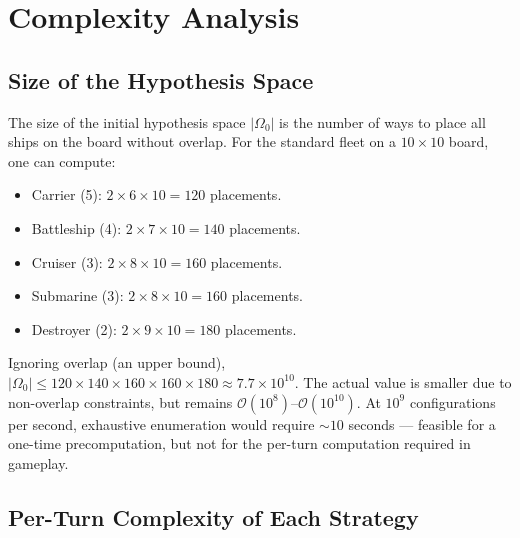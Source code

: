 \documentclass[12pt,a4paper]{article}
\newcommand{\1}{\mathbf{1}}
\newcommand{\bigo}{\mathcal{O}}
\begin{document}
\section{Complexity Analysis}
\label{sec:complexity}

\subsection{Size of the Hypothesis Space}

The size of the initial hypothesis space $|\Omega_0|$ is the number of ways to
place all ships on the board without overlap.  For the standard fleet on a
$10 \times 10$ board, one can compute:
\begin{itemize}[nosep]
  \item Carrier (5): $2 \times 6 \times 10 = 120$ placements.
  \item Battleship (4): $2 \times 7 \times 10 = 140$ placements.
  \item Cruiser (3): $2 \times 8 \times 10 = 160$ placements.
  \item Submarine (3): $2 \times 8 \times 10 = 160$ placements.
  \item Destroyer (2): $2 \times 9 \times 10 = 180$ placements.
\end{itemize}
Ignoring overlap (an upper bound), $|\Omega_0| \leq 120 \times 140 \times 160
\times 160 \times 180 \approx 7.7 \times 10^{10}$.  The actual value is
smaller due to non-overlap constraints, but remains $\bigo(10^8)$--$\bigo(10^{10})$.
At $10^9$ configurations per second, exhaustive enumeration would require
$\sim 10$ seconds --- feasible for a one-time precomputation, but not for
the per-turn computation required in gameplay.

\subsection{Per-Turn Complexity of Each Strategy}
\end{document}
